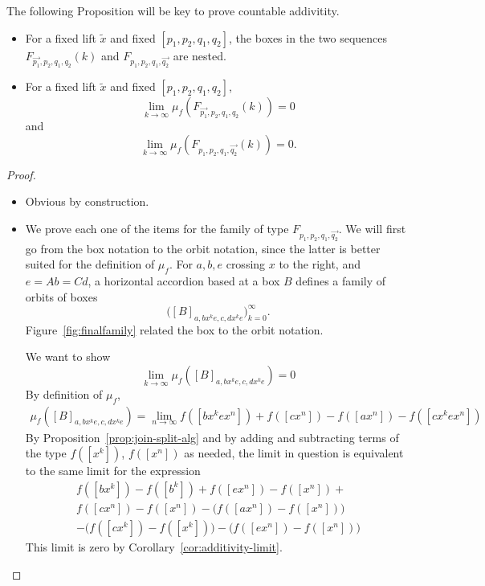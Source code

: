 The following Proposition will be key to prove countable addivitity.

\begin{proposition}
\begin{figure}
\end{figure}

\begin{itemize}
\item For a fixed lift $\tilde{x}$ and fixed $[p_1,p_2,q_1,q_2]$, the boxes in the two sequences $F_{\vec{p_1},p_2,q_1,q_2}(k)$ and $F_{p_1,p_2,q_1,\vec{q_2}}$ are nested.
\item For a fixed lift $\tilde{x}$ and fixed $[p_1,p_2,q_1,q_2]$,  \[
\lim_{k \to \infty} \mu_f(F_{\vec{p_1},p_2,q_1,q_2}(k))= 0
\]
and
\[
\lim_{k \to \infty} \mu_f(F_{p_1,p_2,q_1,\vec{q_2}}(k))= 0.
\]

\end{itemize}
\label{prop:finalfamily1}
\end{proposition}
\begin{proof}
\begin{itemize}
    \item Obvious by construction. 
    \item 
    We prove each one of the items for the family of type $F_{p_1,p_2,q_1,\vec{q_2}}$.
    We will first go from the box notation to the orbit notation, since the latter is better suited for the definition of $\mu_f$.
      For $a,b,e$ crossing $x$ to the right, and $e=Ab=Cd$, a horizontal accordion based at a box $B$ defines a family of orbits of boxes
\[
\bigl([B]_{a,bx^ke,c,dx^k e}\bigr)_{k=0}^\infty.
\]
Figure~\ref{fig:finalfamily} related the box to the orbit notation.

    We want to show
\[
\lim_{k \to \infty} \mu_f([B]_{a,bx^ke,c,dx^k e})=0
\]
By definition of $\mu_f$,
\begin{align*}
\mu_f([B]_{a,bx^ke,c,dx^k e})=\lim_{n\to \infty} f([bx^ke x^n]) + f([cx^n])-f([ax^n])-f([cx^kex^n])
\end{align*}
    By Proposition~\ref{prop:join-split-alg} and by adding and subtracting terms of the type $f([x^k])$, $f([x^n])$ as needed, the limit in question is
    equivalent to the same limit for the expression
    \begin{align*}
       f([bx^k]) - f([b^k]) + f([ex^n]) - f([x^n]) +  \\
        f([cx^n]) - f([x^n]) - \bigl(f([ax^n]) - f([x^n])\bigr)\\
        -\bigl(f([cx^k])-f([x^k])\bigr)-\bigl(f([ex^n])-f([x^n])\bigr)
    \end{align*}
    This limit is zero by Corollary~\ref{cor:additivity-limit}.\qedhere
    \end{itemize}
\end{proof}

